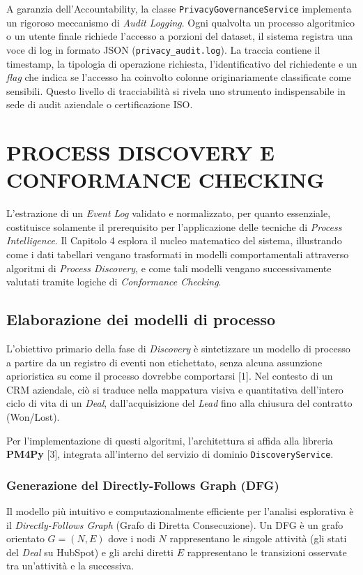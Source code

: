 \documentclass[12pt, a4paper]{report}
\begin{document}
A garanzia dell'Accountability, la classe \texttt{PrivacyGovernanceService} implementa un rigoroso meccanismo di \textit{Audit Logging}. Ogni qualvolta un processo algoritmico o un utente finale richiede l'accesso a porzioni del dataset, il sistema registra una voce di log in formato JSON (\texttt{privacy\_audit.log}). La traccia contiene il timestamp, la tipologia di operazione richiesta, l'identificativo del richiedente e un \textit{flag} che indica se l'accesso ha coinvolto colonne originariamente classificate come sensibili. Questo livello di tracciabilità si rivela uno strumento indispensabile in sede di audit aziendale o certificazione ISO.

\chapter{PROCESS DISCOVERY E CONFORMANCE CHECKING}

L'estrazione di un \textit{Event Log} validato e normalizzato, per quanto essenziale, costituisce solamente il prerequisito per l'applicazione delle tecniche di \textit{Process Intelligence}. Il Capitolo 4 esplora il nucleo matematico del sistema, illustrando come i dati tabellari vengano trasformati in modelli comportamentali attraverso algoritmi di \textit{Process Discovery}, e come tali modelli vengano successivamente valutati tramite logiche di \textit{Conformance Checking}.

\section{Elaborazione dei modelli di processo}
L'obiettivo primario della fase di \textit{Discovery} è sintetizzare un modello di processo a partire da un registro di eventi non etichettato, senza alcuna assunzione aprioristica su come il processo dovrebbe comportarsi [1]. Nel contesto di un CRM aziendale, ciò si traduce nella mappatura visiva e quantitativa dell'intero ciclo di vita di un \textit{Deal}, dall'acquisizione del \textit{Lead} fino alla chiusura del contratto (Won/Lost).

Per l'implementazione di questi algoritmi, l'architettura si affida alla libreria \textbf{PM4Py} [3], integrata all'interno del servizio di dominio \texttt{DiscoveryService}.

\subsection{Generazione del Directly-Follows Graph (DFG)}
Il modello più intuitivo e computazionalmente efficiente per l'analisi esplorativa è il \textit{Directly-Follows Graph} (Grafo di Diretta Consecuzione). Un DFG è un grafo orientato $G = (N, E)$ dove i nodi $N$ rappresentano le singole attività (gli stati del \textit{Deal} su HubSpot) e gli archi diretti $E$ rappresentano le transizioni osservate tra un'attività e la successiva. 
\end{document}
